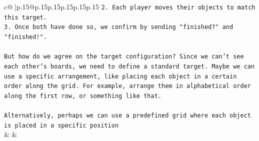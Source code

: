 \documentclass{article}
\begin{document}
{\begin{supertabular}{c@{$\;$}|p{.15\linewidth}@{}p{.15\linewidth}p{.15\linewidth}p{.15\linewidth}p{.15\linewidth}p{.15\linewidth}}
{{{\texttt{2. Each player moves their objects to match this target.} \\
\texttt{3. Once both have done so, we confirm by sending "finished?" and "finished!".} \\
\\ 
\texttt{But how do we agree on the target configuration? Since we can't see each other's boards, we need to define a standard target. Maybe we can use a specific arrangement, like placing each object in a certain order along the grid. For example, arrange them in alphabetical order along the first row, or something like that.} \\
\\ 
\texttt{Alternatively, perhaps we can use a predefined grid where each object is placed in a specific position} \\
            }
        }
    }
    & & \\ \\


\end{supertabular}}
\end{document}
